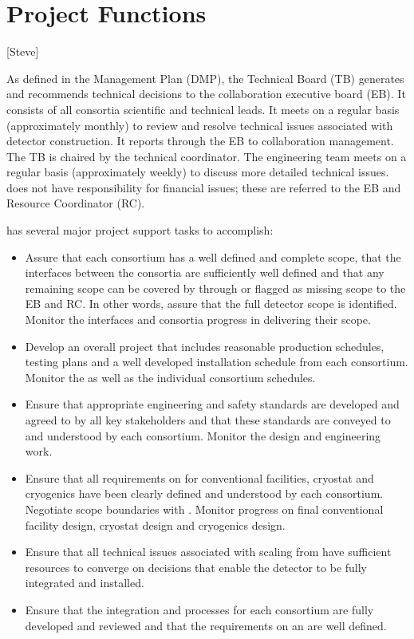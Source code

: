 \chapter{Project Functions}
\label{vl:tc-project}

[Steve]

As defined in the  Management Plan (DMP), the 
Technical Board (TB) generates and recommends technical decisions to the
collaboration executive board (EB).
It consists of all consortia scientific and technical leads. It meets
on a regular basis (approximately monthly) to review and resolve
technical issues associated with detector construction. It reports
through the EB to collaboration management. The  TB
is chaired by the technical coordinator. The
 engineering team meets on a regular basis (approximately weekly)
to discuss more detailed technical issues.  does not have
responsibility for financial issues; these are referred to
the EB and Resource Coordinator (RC).

 has several major project support tasks to accomplish:
\begin{itemize}
\item Assure that each consortium has a well defined and complete
  scope, that the interfaces between the consortia are sufficiently
  well defined and that any remaining scope can be covered by 
  through  or flagged as missing scope to the EB and RC. In
  other words, assure that the full detector scope is
  identified. Monitor the interfaces and consortia progress in
  delivering their scope.
\item Develop an overall project 
  that includes reasonable production schedules, testing plans and a
  well developed installation schedule from each consortium. Monitor
  the  as well as the individual consortium schedules.
\item Ensure that appropriate engineering and safety standards are
  developed and agreed to by all key stakeholders and that these
  standards are conveyed to and understood by each
  consortium. Monitor the design and engineering work.
\item Ensure that all  requirements on  for
  conventional facilities, cryostat and cryogenics have been clearly
  defined and understood by each consortium. Negotiate scope
  boundaries with . Monitor  progress on
  final conventional facility design, cryostat design and cryogenics
  design.
\item Ensure that all technical issues associated with scaling from
   have sufficient resources to converge on
  decisions that enable the detector to be fully integrated and
  installed.
\item Ensure that the integration and  processes for each
  consortium are fully developed and reviewed and that the
  requirements on an  are well defined.
\end{itemize}

